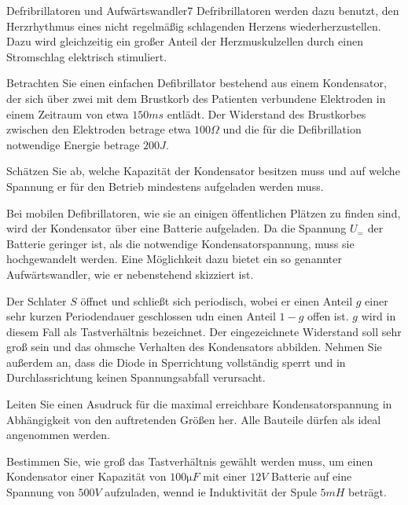 \begin{problem}{Defribrillatoren und Aufwärtswandler}{7}
 Defribrillatoren werden dazu benutzt, den Herzrhythmus eines nicht regelmäßig schlagenden Herzens wiederherzustellen.  Dazu wird gleichzeitig ein großer Anteil der Herzmuskulzellen durch einen Stromschlag elektrisch stimuliert.

Betrachten Sie einen einfachen Defibrillator bestehend aus einem Kondensator, der sich über zwei mit dem Brustkorb des Patienten verbundene Elektroden in einem Zeitraum von etwa $150\unit{ms}$ entlädt.  Der Widerstand des Brustkorbes zwischen den Elektroden betrage etwa $100\unit{\Omega}$ und die für die Defibrillation notwendige Energie betrage $200\unit{J}$.

\begin{abcenum}
\item Schätzen Sie ab, welche Kapazität der Kondensator besitzen muss und auf welche Spannung er für den Betrieb mindestens aufgeladen werden muss.
\end{abcenum}

Bei mobilen Defibrillatoren, wie sie an einigen öffentlichen Plätzen zu finden sind, wird der Kondensator über eine Batterie aufgeladen.  Da die Spannung $U_=$ der Batterie geringer ist, als die notwendige Kondensatorspannung, muss sie hochgewandelt werden.  Eine Möglichkeit dazu bietet ein so genannter Aufwärtswandler, wie er nebenstehend skizziert ist.

Der Schlater $S$ öffnet und schließt sich periodisch, wobei er einen Anteil $g$ einer sehr kurzen Periodendauer geschlossen udn einen Anteil $1-g$ offen ist.  $g$ wird in diesem Fall als Tastverhältnis bezeichnet.  Der eingezeichnete Widerstand soll sehr groß sein und das ohmsche Verhalten des Kondensators abbilden.  Nehmen Sie außerdem an, dass die Diode in Sperrichtung vollständig sperrt und in Durchlassrichtung keinen Spannungsabfall verursacht.

\begin{abcenum}
  \item Leiten Sie einen Asudruck für die maximal erreichbare Kondensatorspannung in Abhängigkeit von den auftretenden Größen her.  Alle Bauteile dürfen als ideal angenommen werden.
\item Bestimmen Sie, wie groß das Tastverhältnis gewählt werden muss, um einen Kondensator einer Kapazität von $100\unit{\micro F}$ mit einer $12\unit{V}$ Batterie auf eine Spannung von $500\unit{V}$ aufzuladen, wennd ie Induktivität der Spule $5\unit{mH}$ beträgt.
\end{abcenum}

\end{problem}

